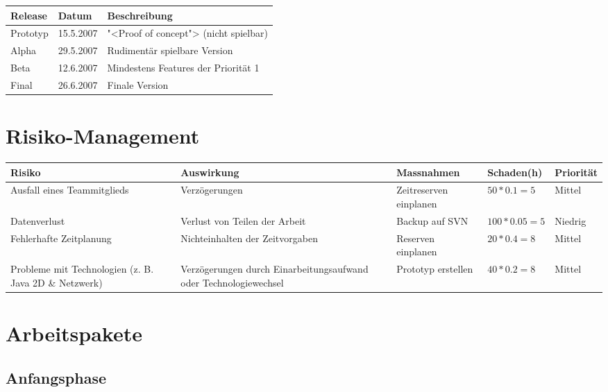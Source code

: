\documentclass[a4paper,12pt,halfparskip,DIV14]{scrreprt}
\begin{document}
\begin{tabular}{@{}lll@{}}
\toprule
Release   & Datum       & Beschreibung \\
\midrule
Prototyp  & 15.5.2007   & "<Proof of concept"> (nicht spielbar) \\
Alpha     & 29.5.2007   & Rudimentär spielbare Version \\
Beta      & 12.6.2007   & Mindestens Features der Priorität 1 \\
Final     & 26.6.2007   & Finale Version \\
\bottomrule
\end{tabular}

\section{Risiko-Management}

\begin{tabular}{@{} p{2.7cm} p{3.6cm} p{4cm} l l @{}}
\toprule
\textbf{Risiko} &
\textbf{Auswirkung} &
\textbf{Massnahmen} &
\textbf{Schaden\footnotemark (h)} &
\textbf{Priorität} \\
\midrule
Ausfall eines Teammitglieds & Verzögerungen & Zeitreserven einplanen  & $50 * 0.1 = 5$ & Mittel \\
\midrule
Datenverlust & Verlust von Teilen der Arbeit & Backup auf SVN & $100 * 0.05 = 5$ & Niedrig \\
\midrule
Fehlerhafte Zeitplanung & Nichteinhalten der Zeitvorgaben & Reserven einplanen & $20 * 0.4 = 8$ & Mittel \\
\midrule
Probleme mit Technologien (z. B. Java 2D \&  Netzwerk) & Verzögerungen durch Einarbeitungsaufwand oder Technologiewechsel & Prototyp erstellen & $40 * 0.2 = 8$ & Mittel \\
\bottomrule
\end{tabular}


\section{Arbeitspakete}

\subsection{Anfangsphase}
\end{document}
